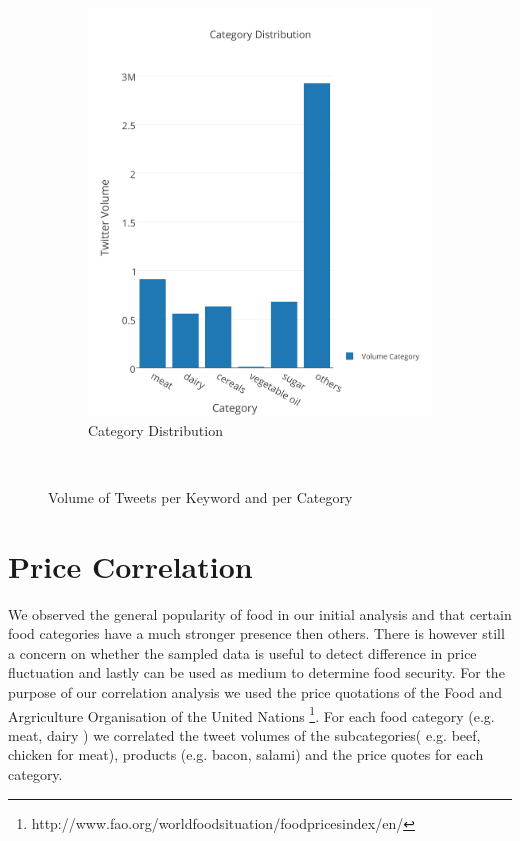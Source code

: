 \begin{figure}[H]
\begin{subfigure}[b]{0.5\textwidth}
                \includegraphics[width=\textwidth]{img/anal/exp_dist_cat}
                \caption{Category Distribution}
                \label{fig:cat}
        \end{subfigure}
        ~ %
      
        \caption{Volume of Tweets per Keyword and per Category}\label{fig:distribution}
\end{figure}


\section{Price Correlation}


We observed the general popularity of food in our initial analysis and that certain food categories have a much stronger presence then others. There is however still a concern on whether the sampled data is useful to detect difference in price fluctuation and lastly can  be used as medium to determine food security. For the purpose of our correlation analysis we used the price quotations of the Food and Argriculture Organisation of the United Nations \footnote{http://www.fao.org/worldfoodsituation/foodpricesindex/en/}. For each food category (e.g. meat, dairy ) we correlated the tweet volumes of the subcategories( e.g. beef, chicken for meat), products (e.g. bacon, salami) and the price quotes for each category.  

